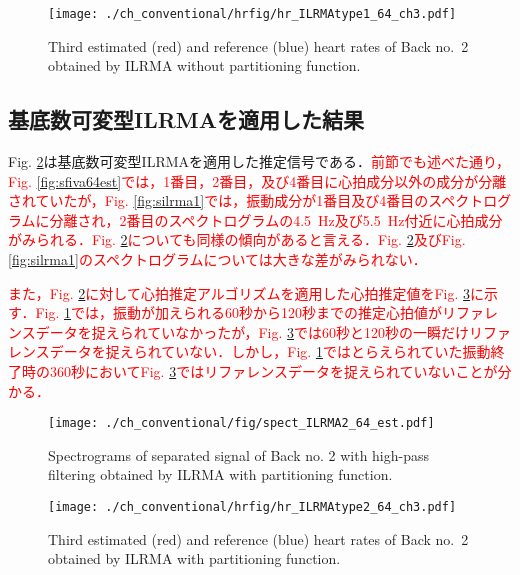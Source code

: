 \begin{figure}[tb]
\centering
\texttt{[image: ./ch\_conventional/hrfig/hr\_ILRMAtype1\_64\_ch3.pdf]}
\caption{Third estimated (red) and reference (blue) heart rates of Back no.~2 obtained by ILRMA without partitioning function.}
\label{fig:hrilrma1}
\end{figure}

\subsection{基底数可変型ILRMAを適用した結果}
\label{sec:conv:resultilrma2}
Fig. \ref{fig:silrma2}は基底数可変型ILRMAを適用した推定信号である．\textcolor{red}{前節でも述べた通り，Fig. \ref{fig:sfiva64est}では，1番目，2番目，及び4番目に心拍成分以外の成分が分離されていたが，Fig. \ref{fig:silrma1}では，振動成分が1番目及び4番目のスペクトログラムに分離され，2番目のスペクトログラムの4.5~Hz及び5.5~Hz付近に心拍成分がみられる．Fig. \ref{fig:silrma2}についても同様の傾向があると言える．Fig. \ref{fig:silrma2}及びFig. \ref{fig:silrma1}のスペクトログラムについては大きな差がみられない．}

\textcolor{red}{また，Fig. \ref{fig:silrma2}に対して心拍推定アルゴリズムを適用した心拍推定値をFig. \ref{fig:hrilrma2}に示す．Fig. \ref{fig:hrilrma1}では，振動が加えられる60秒から120秒までの推定心拍値がリファレンスデータを捉えられていなかったが，Fig. \ref{fig:hrilrma2}では60秒と120秒の一瞬だけリファレンスデータを捉えられていない．しかし，Fig. \ref{fig:hrilrma1}ではとらえられていた振動終了時の360秒においてFig. \ref{fig:hrilrma2}ではリファレンスデータを捉えられていないことが分かる．}

\begin{figure}[tb]
\centering
\texttt{[image: ./ch\_conventional/fig/spect\_ILRMA2\_64\_est.pdf]}
\caption{Spectrograms of separated signal of Back no. 2 with high-pass filtering obtained by ILRMA with partitioning function.}
\label{fig:silrma2}
\end{figure}

\begin{figure}[tb]
\centering
\texttt{[image: ./ch\_conventional/hrfig/hr\_ILRMAtype2\_64\_ch3.pdf]}
\caption{Third estimated (red) and reference (blue) heart rates of Back no.~2 obtained by ILRMA with partitioning function.}
\label{fig:hrilrma2}
\end{figure}


